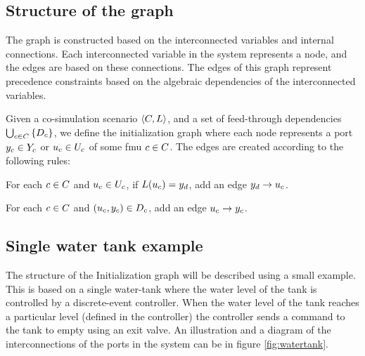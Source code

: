 \documentclass[runningheads]{llncs}
\begin{document}
\subsection{Structure of the graph}
The graph is constructed based on the interconnected variables and internal connections. Each interconnected variable in the system represents a node, and the edges are based on these connections. The edges of this graph represent precedence constraints based on the algebraic dependencies of the interconnected variables. 

\begin{definition}\label{def:initialization_graph}
  Given a co-simulation scenario $ \left\langle C, L \right\rangle $, and a set of feed-through dependencies $\bigcup_{c \in C}  \left\{ D_{c} \right\}$, we define the initialization graph where each node represents a port $y_{c} \in Y_{c}$ or $u_{c} \in U_{c}$ of some fmu $c \in C$. The edges are created according to the following rules:
  \begin{compactenum}
    \item For each $c \in C$ and $u_{c} \in U_{c}$, if $L(u_{c}) = y_{d}$, add an edge $y_{d} -> u_{c}$.
    \item For each $c \in C$ and $(u_{c},y_{c}) \in D_{c}$, add an edge $u_{c} -> y_{c}$.
  \end{compactenum}
\end{definition}

\subsection{Single water tank example}
The structure of the Initialization graph will be described using a small example. This is based on a single water-tank where the water level of the tank is controlled by a discrete-event controller. When the water level of the tank reaches a particular level (defined in the controller) the controller sends a command to the tank to empty using an exit valve. An illustration and a diagram of the interconnections of the ports in the system can be in figure \ref{fig:watertank}.
\end{document}
